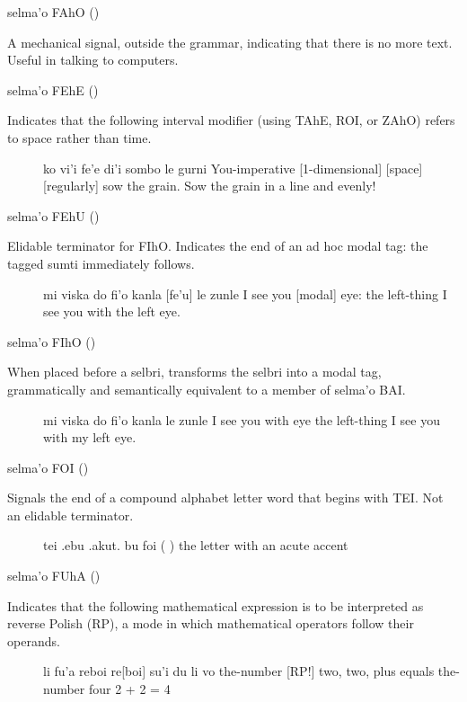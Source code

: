 selma'o FAhO () 

A mechanical signal, outside the grammar, indicating that
    there is no more text. Useful in talking to computers.

selma'o FEhE ()

Indicates that the following interval modifier (using TAhE,
    ROI, or ZAhO) refers to space rather than time.
\begin{description}
\item[] ko vi'i fe'e di'i sombo le gurni You-imperative [1-dimensional] [space] [regularly] sow the grain. Sow the grain in a line and evenly!
\end{description}

selma'o FEhU () 

Elidable terminator for FIhO. Indicates the end of an ad hoc
    modal tag: the tagged sumti immediately follows.
\begin{description}
\item[] mi viska do fi'o kanla [fe'u] le zunle I see you [modal] eye: the left-thing I see you with the left eye.
\end{description}

selma'o FIhO () 

When placed before a selbri, transforms the selbri into a
    modal tag, grammatically and semantically equivalent to a
    member of selma'o BAI.
\begin{description}
\item[] mi viska do fi'o kanla le zunle I see you with eye the left-thing I see you with my left eye.
\end{description}

selma'o FOI () 

Signals the end of a compound alphabet letter word that
    begins with TEI. Not an elidable terminator.
\begin{description}
\item[] tei .ebu .akut. bu foi (   ) the letter  with an acute accent
\end{description}

selma'o FUhA () 

Indicates that the following mathematical expression is to
    be interpreted as reverse Polish (RP), a mode in which
    mathematical operators follow their operands.
\begin{description}
\item[] li fu'a reboi re[boi] su'i du li vo the-number [RP!] two, two, plus equals the-number four 2 + 2 = 4
\end{description}

